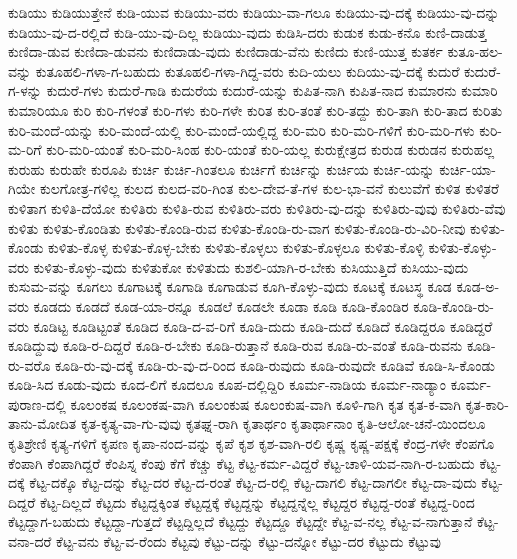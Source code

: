 {ಕುಡಿಯು
ಕುಡಿಯುತ್ತೇನೆ
ಕುಡಿ-ಯುವ
ಕುಡಿಯು-ವರು
ಕುಡಿಯು-ವಾ-ಗಲೂ
ಕುಡಿಯು-ವು-ದಕ್ಕೆ
ಕುಡಿಯು-ವು-ದನ್ನು
ಕುಡಿಯು-ವು-ದ-ರಲ್ಲಿದೆ
ಕುಡಿ-ಯು-ವು-ದಿಲ್ಲ
ಕುಡಿಯು-ವುದು
ಕುಡಿಸಿ-ದರು
ಕುಡುಕ
ಕುಡು-ಕನೊ
ಕುಣಿ-ದಾಡುತ್ತ
ಕುಣಿದಾ-ಡುವ
ಕುಣಿದಾ-ಡುವನು
ಕುಣಿದಾಡು-ವುದು
ಕುಣಿದಾಡು-ವೆನು
ಕುಣಿದು
ಕುಣಿ-ಯುತ್ತ
ಕುತರ್ಕ
ಕುತೂ-ಹಲ-ವನ್ನು
ಕುತೂಹಲಿ-ಗಳಾ-ಗ-ಬಹುದು
ಕುತೂಹಲಿ-ಗಳಾ-ಗಿದ್ದ-ವರು
ಕುದಿ-ಯಲು
ಕುದಿಯು-ವು-ದಕ್ಕೆ
ಕುದುರೆ
ಕುದುರೆ-ಗ-ಳನ್ನು
ಕುದುರೆ-ಗಳು
ಕುದುರೆ-ಗಾಡಿ
ಕುದುರೆಯ
ಕುದುರೆ-ಯನ್ನು
ಕುಪಿತ-ನಾಗಿ
ಕುಪಿತ-ನಾದ
ಕುಮಾರನು
ಕುಮಾರಿ
ಕುಮಾರಿಯೂ
ಕುರಿ
ಕುರಿ-ಗಳಂತೆ
ಕುರಿ-ಗಳು
ಕುರಿ-ಗಳೇ
ಕುರಿತ
ಕುರಿ-ತಂತೆ
ಕುರಿ-ತದ್ದು
ಕುರಿ-ತಾಗಿ
ಕುರಿ-ತಾದ
ಕುರಿತು
ಕುರಿ-ಮಂದೆ-ಯನ್ನು
ಕುರಿ-ಮಂದೆ-ಯಲ್ಲಿ
ಕುರಿ-ಮಂದೆ-ಯಲ್ಲಿದ್ದ
ಕುರಿ-ಮರಿ
ಕುರಿ-ಮರಿ-ಗಳಿಗೆ
ಕುರಿ-ಮರಿ-ಗಳು
ಕುರಿ-ಮ-ರಿಗೆ
ಕುರಿ-ಮರಿ-ಯಂತೆ
ಕುರಿ-ಮರಿ-ಸಿಂಹ
ಕುರಿ-ಯಂತೆ
ಕುರಿ-ಯಲ್ಲ
ಕುರುಕ್ಷೇತ್ರದ
ಕುರುಡ
ಕುರುಡನ
ಕುರುಹಲ್ಲ
ಕುರುಹು
ಕುರುಹೇ
ಕುರೂಪಿ
ಕುರ್ಚಿ
ಕುರ್ಚಿ-ಗಿಂತಲೂ
ಕುರ್ಚಿಗೆ
ಕುರ್ಚಿನ್ನು
ಕುರ್ಚಿಯ
ಕುರ್ಚಿ-ಯನ್ನು
ಕುರ್ಚಿ-ಯಾ-ಗಿಯೇ
ಕುಲಗೋತ್ರ-ಗಳಿಲ್ಲ
ಕುಲದ
ಕುಲದ-ವರಿ-ಗಿಂತ
ಕುಲ-ದೇವ-ತೆ-ಗಳ
ಕುಲ-ಭಾ-ವನೆ
ಕುಲುವೆಗೆ
ಕುಳಿತ
ಕುಳಿತರೆ
ಕುಳಿತಾಗ
ಕುಳಿತಿ-ದೆಯೋ
ಕುಳಿತಿರು
ಕುಳಿತಿ-ರುವ
ಕುಳಿತಿರು-ವರು
ಕುಳಿತಿರು-ವು-ದನ್ನು
ಕುಳಿತಿರು-ವುವು
ಕುಳಿತಿರು-ವೆವು
ಕುಳಿತು
ಕುಳಿತು-ಕೊಂಡಿತು
ಕುಳಿತು-ಕೊಂಡಿ-ರುವ
ಕುಳಿತು-ಕೊಂಡಿ-ರು-ವಾಗ
ಕುಳಿತು-ಕೊಂಡಿ-ರು-ವಿರಿ-ನೀವು
ಕುಳಿತು-ಕೊಂಡು
ಕುಳಿತು-ಕೊಳ್ಳ
ಕುಳಿತು-ಕೊಳ್ಳ-ಬೇಕು
ಕುಳಿತು-ಕೊಳ್ಳಲು
ಕುಳಿತು-ಕೊಳ್ಳಲೂ
ಕುಳಿತು-ಕೊಳ್ಳಿ
ಕುಳಿತು-ಕೊಳ್ಳು-ವರು
ಕುಳಿತು-ಕೊಳ್ಳು-ವುದು
ಕುಳಿತುಕೋ
ಕುಳಿತುದು
ಕುಶಲಿ-ಯಾಗಿ-ರ-ಬೇಕು
ಕುಸಿಯುತ್ತಿದೆ
ಕುಸಿಯು-ವುದು
ಕುಸುಮ-ವನ್ನು
ಕೂಗಲು
ಕೂಗಾಟಕ್ಕೆ
ಕೂಗಾಡಿ
ಕೂಗಾಡುವ
ಕೂಗಿ-ಕೊಳ್ಳು-ವುದು
ಕೂಟಕ್ಕೆ
ಕೂಟಸ್ಥ
ಕೂಡ
ಕೂಡ-ಅ-ವರು
ಕೂಡದು
ಕೂಡದೆ
ಕೂಡ-ಯಾ-ರನ್ನೂ
ಕೂಡಲೆ
ಕೂಡಲೇ
ಕೂಡಾ
ಕೂಡಿ
ಕೂಡಿ-ಕೊಂಡಿರ
ಕೂಡಿ-ಕೊಂಡಿ-ರು-ವರು
ಕೂಡಿಟ್ಟ
ಕೂಡಿಟ್ಟಂತೆ
ಕೂಡಿದ
ಕೂಡಿ-ದ-ವ-ರಿಗೆ
ಕೂಡಿ-ದುದು
ಕೂಡಿ-ದುದೆ
ಕೂಡಿದೆ
ಕೂಡಿದ್ದರೂ
ಕೂಡಿದ್ದರೆ
ಕೂಡಿದ್ದುವು
ಕೂಡಿ-ರ-ದಿದ್ದರೆ
ಕೂಡಿ-ರ-ಬೇಕು
ಕೂಡಿ-ರುತ್ತಾನೆ
ಕೂಡಿ-ರುವ
ಕೂಡಿ-ರು-ವಂತೆ
ಕೂಡಿ-ರುವನು
ಕೂಡಿ-ರು-ವರೊ
ಕೂಡಿ-ರು-ವು-ದಕ್ಕೆ
ಕೂಡಿ-ರು-ವು-ದ-ರಿಂದ
ಕೂಡಿ-ರುವುದು
ಕೂಡಿ-ರುವುದೇ
ಕೂಡಿವೆ
ಕೂಡಿ-ಸಿ-ಕೊಂಡು
ಕೂಡಿ-ಸಿದ
ಕೂಡು-ವುದು
ಕೂದ-ಲಿಗೆ
ಕೂದಲೂ
ಕೂಪ-ದಲ್ಲಿದ್ದಿರಿ
ಕೂರ್ಮ-ನಾಡಿಯ
ಕೂರ್ಮ-ನಾಡ್ಯಾಂ
ಕೂರ್ಮ-ಪುರಾಣ-ದಲ್ಲಿ
ಕೂಲಂಕಷ
ಕೂಲಂಕಷ-ವಾಗಿ
ಕೂಲಂಕುಷ
ಕೂಲಂಕುಷ-ವಾಗಿ
ಕೂಳಿ-ಗಾಗಿ
ಕೃತ
ಕೃತ-ಕ-ವಾಗಿ
ಕೃತ-ಕಾರಿ-ತಾನು-ಮೋದಿತ
ಕೃತ-ಕೃತ್ಯ-ವಾ-ಗು-ವುವು
ಕೃತಘ್ನ-ರಾಗಿ
ಕೃತಾರ್ಥಂ
ಕೃತಾರ್ಥಾನಾಂ
ಕೃತಿ-ಆಲೋ-ಚನೆ-ಯಿಂದಲೂ
ಕೃತಿಶ್ರೇಣಿ
ಕೃತ್ಯ-ಗಳಿಗೆ
ಕೃಪಣ
ಕೃಪಾ-ನಂದ-ವನ್ನು
ಕೃಪೆ
ಕೃಶ
ಕೃಶ-ವಾಗಿ-ರಲಿ
ಕೃಷ್ಣ
ಕೃಷ್ಣ-ಪಕ್ಷಕ್ಕೆ
ಕೆಂದ್ರ-ಗಳೇ
ಕೆಂಪಗೊ
ಕೆಂಪಾಗಿ
ಕೆಂಪಾಗಿದ್ದರೆ
ಕೆಂಪಿಸ್ನ
ಕೆಂಪು
ಕೆಗೆ
ಕೆಚ್ಚು
ಕೆಟ್ಟ
ಕೆಟ್ಟ-ಕರ್ಮ-ವಿದ್ದರೆ
ಕೆಟ್ಟ-ಚಾಳಿ-ಯವ-ನಾಗಿ-ರ-ಬಹುದು
ಕೆಟ್ಟ-ದಕ್ಕೆ
ಕೆಟ್ಟ-ದಕ್ಕೊ
ಕೆಟ್ಟ-ದನ್ನು
ಕೆಟ್ಟ-ದರ
ಕೆಟ್ಟ-ದ-ರಂತೆ
ಕೆಟ್ಟ-ದ-ರಲ್ಲಿ
ಕೆಟ್ಟ-ದಾಗಲಿ
ಕೆಟ್ಟ-ದಾಗಲೀ
ಕೆಟ್ಟ-ದಾ-ವುದು
ಕೆಟ್ಟ-ದಿದ್ದರೆ
ಕೆಟ್ಟ-ದಿಲ್ಲದೆ
ಕೆಟ್ಟದು
ಕೆಟ್ಟದ್ದಕ್ಕಿಂತ
ಕೆಟ್ಟದ್ದಕ್ಕೆ
ಕೆಟ್ಟದ್ದನ್ನು
ಕೆಟ್ಟದ್ದನ್ನೆಲ್ಲ
ಕೆಟ್ಟದ್ದರ
ಕೆಟ್ಟದ್ದ-ರಂತೆ
ಕೆಟ್ಟದ್ದ-ರಿಂದ
ಕೆಟ್ಟದ್ದಾಗ-ಬಹುದು
ಕೆಟ್ಟದ್ದಾ-ಗುತ್ತದೆ
ಕೆಟ್ಟದ್ದಿಲ್ಲದೆ
ಕೆಟ್ಟದ್ದು
ಕೆಟ್ಟದ್ದೂ
ಕೆಟ್ಟದ್ದೇ
ಕೆಟ್ಟ-ವ-ನಲ್ಲ
ಕೆಟ್ಟ-ವ-ನಾಗುತ್ತಾನೆ
ಕೆಟ್ಟ-ವನಾ-ದರೆ
ಕೆಟ್ಟ-ವನು
ಕೆಟ್ಟ-ವ-ರೆಂದು
ಕೆಟ್ಟವು
ಕೆಟ್ಟು-ದನ್ನು
ಕೆಟ್ಟು-ದನ್ನೋ
ಕೆಟ್ಟು-ದರ
ಕೆಟ್ಟುದು
ಕೆಟ್ಟುವು
}
